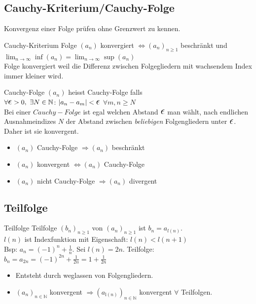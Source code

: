 \documentclass[a4paper]{article}
\let\oldepsilon\epsilon
\renewcommand{\epsilon}{\text{\Large $\oldepsilon$}}
\def\limn{\lim_{n\to \infty}}
\newcommand\N{\ensuremath{\mathbb{N}}}
\begin{document}
\subsection{Cauchy-Kriterium/Cauchy-Folge}
Konvergenz einer Folge prüfen ohne Grenzwert zu kennen.

\begin{mainbox}{Cauchy-Kriterium}
  Folge $(a_n)$ konvergiert $\iff (a_n)_{n \geqslant 1}$ beschränkt und $\limn \inf(a_n) = \limn \sup(a_n)$ \\  
  \tiny \color{gray}
      Folge konvergiert weil die Differenz zwischen Folgegliedern mit wachsendem Index immer kleiner wird.  
  \normalsize \color{black} 
\end{mainbox}

\begin{mainbox}{Cauchy-Folge}
    $(a_n)$ heisst Cauchy-Folge falls  \\ $\forall \epsilon > 0, \ \exists N \in \mathbb{N}$: $|a_n - a_m| < \epsilon$ $\forall m,n \geq N$ \\
      \tiny \color{gray}
        Bei einer $Cauchy-Folge$ ist egal welchen Abstand $\epsilon$ man wählt, nach endlichen Ausnahmeindizes $N$ der Abstand zwischen \textit{beliebigen} Folgengliedern unter $\epsilon$. Daher ist sie konvergent.
      \normalsize \color{black} 
\end{mainbox}
\begin{itemize}[leftmargin=4.5mm, topsep=1pt, parsep=1pt]
  \item $(a_n)$ Cauchy-Folge $\Rightarrow (a_n)$ beschränkt
  \item  $(a_n)$ konvergent $\Leftrightarrow (a_n)$ Cauchy-Folge
  \item $(a_n)$ nicht Cauchy-Folge $\Rightarrow (a_n)$ divergent
\end{itemize}

\subsection{Teilfolge}
\begin{mainbox}{Teilfolge}
  Teilfolge $(b_n)_{n \geqslant 1}$ von $(a_n)_{n \geqslant 1}$ ist $b_n = a_{l(n)}$. \\
  $l(n)$ ist Indexfunktion mit Eigenschaft: $l(n) < l(n + 1)$ \\
  \tiny \color{gray}
    Bsp: $a_n = (-1)^n + \frac{1}{n}$. Sei $l(n) = 2n$. Teilfolge: $b_n = a_{2n} = (-1)^{2n} + \frac{1}{2n} = 1 + \frac{1}{2n}$
  \normalsize \color{black}
\end{mainbox}
\begin{itemize}[leftmargin=4.5mm, topsep=1pt, parsep=1pt]
    \item Entsteht durch weglassen von Folgengliedern.
    \item $(a_n)_{n \in \N}$ konvergent $\Rightarrow (a_{\text{l}(n)})_{n \in \N}$ konvergent $\forall$ Teilfolgen.
\end{itemize}
\end{document}
